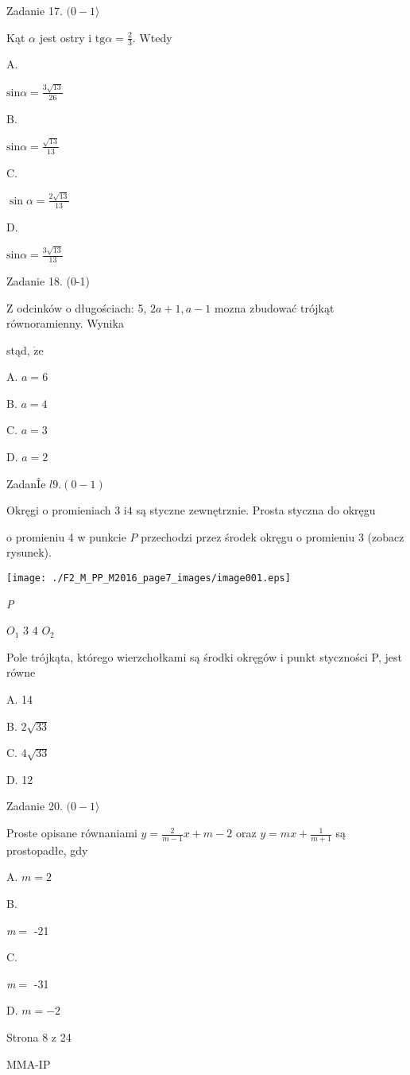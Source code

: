 \documentclass[a4paper,12pt]{article}
\begin{document}
Zadanie 17. $(0-1\rangle$

Kąt $\alpha$ jest ostry i $\displaystyle \mathrm{t}\mathrm{g}\alpha=\frac{2}{3}$. Wtedy

A.

$\mathrm{s}$i$\displaystyle \mathrm{n}\alpha=\frac{3\sqrt{13}}{26}$

B.

$\mathrm{s}$i$\displaystyle \mathrm{n}\alpha=\frac{\sqrt{13}}{13}$

C.

$\displaystyle \sin\alpha=\frac{2\sqrt{13}}{13}$

D.

$\mathrm{s}$i$\displaystyle \mathrm{n}\alpha=\frac{3\sqrt{13}}{13}$

Zadanie 18. (0-1)

$\mathrm{Z}$ odcinków o długościach: 5, $2a+1, a-1$ mozna zbudować trójkąt równoramienny. Wynika

stąd, $\dot{\mathrm{z}}\mathrm{e}$

A. $a=6$

B. $a=4$

C. $a=3$

D. $a=2$

ZadanÎe $l9. (0-1)$

Okręgi o promieniach 3 $\mathrm{i} 4$ są styczne zewnętrznie. Prosta styczna do okręgu

o promieniu 4 w punkcie $P$ przechodzi przez środek okręgu o promieniu 3 (zobacz rysunek).
\begin{center}
\texttt{[image: ./F2\_M\_PP\_M2016\_page7\_images/image001.eps]}
\end{center}
{\it P}

$O_{1}$  3 4  $O_{2}$

Pole trójkąta, którego wierzchołkami są środki okręgów i punkt styczności P, jest równe

A. 14

B. $2\sqrt{33}$

C. $4\sqrt{33}$

D. 12

Zadanie 20. $(0-1\rangle$

Proste opisane równaniami $y=\displaystyle \frac{2}{m-1}x+m-2$ oraz $y=mx+\displaystyle \frac{1}{m+1}$ są prostopadłe, gdy

A. $m=2$

B.

{\it m}$=$ -21

C.

{\it m}$=$ -31

D. $m=-2$

Strona 8 z 24

MMA-IP
\end{document}
